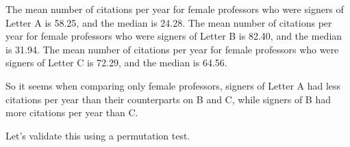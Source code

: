 \documentclass[]{article}
\newenvironment{Shaded}{\begin{snugshade}}{\end{snugshade}}
\newcommand{\DataTypeTok}[1]{\textcolor[rgb]{0.13,0.29,0.53}{#1}}
\newcommand{\KeywordTok}[1]{\textcolor[rgb]{0.13,0.29,0.53}{\textbf{#1}}}
\newcommand{\NormalTok}[1]{#1}
\newcommand{\OperatorTok}[1]{\textcolor[rgb]{0.81,0.36,0.00}{\textbf{#1}}}
\newcommand{\OtherTok}[1]{\textcolor[rgb]{0.56,0.35,0.01}{#1}}
\newcommand{\StringTok}[1]{\textcolor[rgb]{0.31,0.60,0.02}{#1}}
\begin{document}
The mean number of citations per year for female professors who were
signers of Letter A is 58.25, and the median is 24.28. The mean number
of citations per year for female professors who were signers of Letter B
is 82.40, and the median is 31.94. The mean number of citations per year
for female professors who were signers of Letter C is 72.29, and the
median is 64.56.

So it seems when comparing only female professors, signers of Letter A
had less citations per year than their counterparts on B and C, while
signers of B had more citations per year than C.

Let's validate this using a permutation test.

\begin{Shaded}
\end{Shaded}
\end{document}

